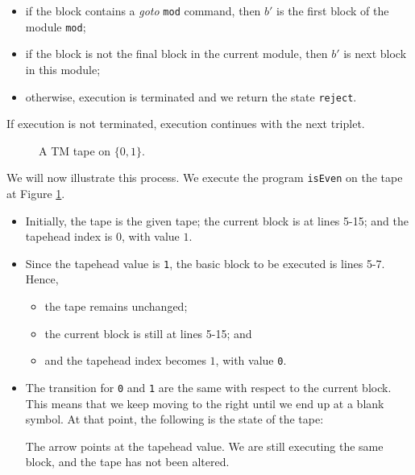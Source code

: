 \begin{appendices}
\begin{itemize}
\begin{itemize}
\begin{itemize}
            \item if the block contains a \textit{goto} \texttt{mod} command, then $b'$ is the first block of the module \texttt{mod};
            \item if the block is not the final block in the current module, then $b'$ is next block in this module;
            \item otherwise, execution is terminated and we return the state \texttt{reject}.
        \end{itemize}
    \end{itemize}
    If execution is not terminated, execution continues with the next triplet.
\end{itemize}

\begin{figure}[htb]
    \centering
    \caption{A TM tape on $\{0, 1\}$.}
    \label{fig:tml_tape_example}
\end{figure}
 
We will now illustrate this process. We execute the program \texttt{isEven} on the tape at Figure \ref{fig:tml_tape_example}.
\begin{itemize}
    \item Initially, the tape is the given tape; the current block is at lines 5-15; and the tapehead index is $0$, with value $1$.
    
    \item Since the tapehead value is \texttt{1}, the basic block to be executed is lines 5-7. Hence,
    \begin{itemize}
        \item the tape remains unchanged;
        \item the current block is still at lines 5-15; and
        \item and the tapehead index becomes $1$, with value \texttt{0}.
    \end{itemize}
    
    \item The transition for \texttt{0} and \texttt{1} are the same with respect to the current block. This means that we keep moving to the right until we end up at a blank symbol. At that point, the following is the state of the tape:
    \begin{figure}[H]
        \centering
    \end{figure}
    The arrow points at the tapehead value. We are still executing the same block, and the tape has not been altered.
    

\end{itemize}
\end{appendices}
